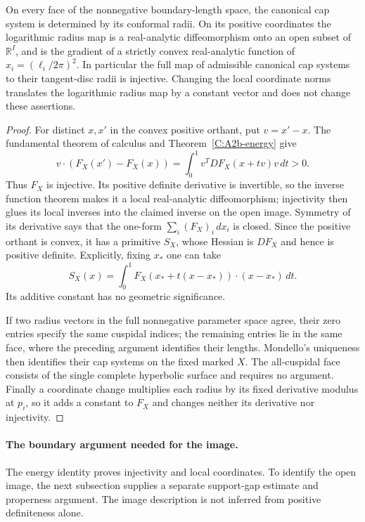 \begin{corollary}
\label{C:A2b-injectivity}
On every face of the nonnegative boundary-length space, the canonical cap system is determined by its conformal radii. On its positive coordinates the logarithmic radius map is a real-analytic diffeomorphism onto an open subset of $\mathbb R^I$, and is the gradient of a strictly convex real-analytic function of $x_i=(\ell_i/2\pi)^2$. In particular the full map of admissible canonical cap systems to their tangent-disc radii is injective. Changing the local coordinate norms translates the logarithmic radius map by a constant vector and does not change these assertions.
\end{corollary}
\begin{proof}
For distinct $x,x'$ in the convex positive orthant, put $v=x'-x$. The fundamental theorem of calculus and Theorem~\ref{C:A2b-energy} give
\[
 v\cdot(F_X(x')-F_X(x))
 =\int_0^1v^TDF_X(x+tv)v\,dt>0.
\]
Thus $F_X$ is injective. Its positive definite derivative is invertible, so the inverse function theorem makes it a local real-analytic diffeomorphism; injectivity then glues its local inverses into the claimed inverse on the open image. Symmetry of its derivative says that the one-form $\sum_i(F_X)_i\,dx_i$ is closed. Since the positive orthant is convex, it has a primitive $S_X$, whose Hessian is $DF_X$ and hence is positive definite. Explicitly, fixing $x_*$ one can take
\[
 S_X(x)=\int_0^1F_X(x_*+t(x-x_*))\cdot(x-x_*)\,dt.
\]
Its additive constant has no geometric significance.

If two radius vectors in the full nonnegative parameter space agree, their zero entries specify the same cuspidal indices; the remaining entries lie in the same face, where the preceding argument identifies their lengths. Mondello's uniqueness then identifies their cap systems on the fixed marked $X$. The all-cuspidal face consists of the single complete hyperbolic surface and requires no argument. Finally a coordinate change multiplies each radius by its fixed derivative modulus at $p_i$, so it adds a constant to $F_X$ and changes neither its derivative nor injectivity.
\end{proof}

\paragraph{The boundary argument needed for the image.}
The energy identity proves injectivity and local coordinates. To identify the open image, the next subsection supplies a separate support-gap estimate and properness argument. The image description is not inferred from positive definiteness alone.
